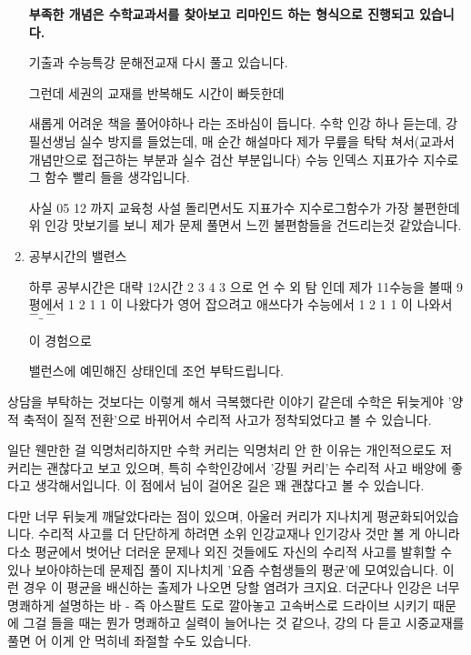 \begin{enumerate}
        \textbf{부족한 개념은 수학교과서를 찾아보고 리마인드 하는 형식으로 진행되고 있습니다.}
        \vspace{5mm}

        기출과 수능특강 문해전교재 다시 풀고 있습니다.
        \vspace{5mm}

        그런데 세권의 교재를 반복해도 시간이 빠듯한데
        \vspace{5mm}

        새롭게 어려운 책을 풀어야하나 라는 조바심이 듭니다.
        수학 인강 하나 듣는데, 강필선생님 실수 방지를 들었는데,
        매 순간 해설마다 제가 무릎을 탁탁 쳐서(교과서 개념만으로 접근하는 부분과 실수 검산 부분입니다)
        수능 인덱스 지표가수 지수로그 함수 빨리 들을 생각입니다.
        \vspace{5mm}

        사실 05 12 까지 교육청 사설 돌리면서도 지표가수 지수로그함수가 가장 불편한데
        위 인강 맛보기를 보니 제가 문제 풀면서 느낀 불편함들을 건드리는것 같았습니다.
        \vspace{5mm}

        \item 공부시간의 밸련스
        \vspace{5mm}

        하루 공부시간은 대략 12시간
        2 3 4 3 으로 언 수 외 탐 인데
        제가 11수능을 볼때 9평에서 1 2 1 1 이 나왔다가
        영어 잡으려고 애쓰다가 수능에서 1 2 1 1 이 나와서 $-\_-$
        \vspace{5mm}

        이 경험으로
        \vspace{5mm}

        밸런스에 예민해진 상태인데 조언 부탁드립니다.
        \vspace{5mm}
    \end{enumerate}

    상담을 부탁하는 것보다는 이렇게 해서 극복했다란 이야기 같은데
    수학은 뒤늦게야 '양적 축적이 질적 전환'으로 바뀌어서 수리적 사고가 정착되었다고 볼 수 있습니다.
    \vspace{5mm}

    일단 웬만한 걸 익명처리하지만 수학 커리는 익명처리 안 한 이유는
    개인적으로도 저 커리는 괜찮다고 보고 있으며, 특히 수학인강에서 '강필 커리'는 수리적 사고 배양에 좋다고 생각해서입니다.
    이 점에서 님이 걸어온 길은 꽤 괜찮다고 볼 수 있습니다.
    \vspace{5mm}

    다만 너무 뒤늦게 깨달았다라는 점이 있으며, 아울러 커리가 지나치게 평균화되어있습니다.
    수리적 사고를 더 단단하게 하려면 소위 인강교재나 인기강사 것만 볼 게 아니라
    다소 평균에서 벗어난 더러운 문제나 외진 것들에도 자신의 수리적 사고를 발휘할 수 있나 보아야하는데
    문제집 풀이 지나치게 '요즘 수험생들의 평균'에 모여있습니다. 이런 경우 이 평균을 배신하는 출제가 나오면 당할 염려가 크지요.
    더군다나 인강은 너무 명쾌하게 설명하는 바 - 즉 아스팔트 도로 깔아놓고 고속버스로 드라이브 시키기 때문에
    그걸 들을 때는 뭔가 명쾌하고 실력이 늘어나는 것 같으나, 강의 다 듣고 시중교재를 풀면 어 이게 안 먹히네 좌절할 수도 있습니다.
    \vspace{5mm}

